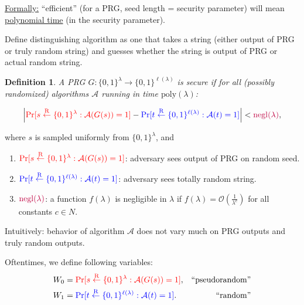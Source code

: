 \documentclass{article}
\newtheorem{definition}{Definition}
\begin{document}
\underline{Formally:} ``efficient'' (for a PRG, seed length = security parameter) will mean \underline{polynomial time} (in the security parameter).

Define distinguishing algorithm as one that takes a string (either output of PRG or truly random string) and guesses whether the string is output of PRG or actual random string.

\begin{definition}
A PRG $G:\{0,1\}^{\lambda} \rightarrow \{0,1\}^{\ell(\lambda)}$ is secure if for all (possibly randomized) algorithms $\mathcal{A}$ running in time $\mathrm{poly}(\lambda)$: 
\end{definition}
                                          
\begin{eqnarray*}
    \left | {\color{red} \mathrm{Pr}[s \overset{\rm R}{\leftarrow} \{0,1\}^{\lambda} : \mathcal{A}(G(s))=1]} - {\color{blue} \mathrm{Pr}[t \overset{\mathrm{R}}{\leftarrow} \{0,1\}^{\ell(\lambda)} : \mathcal{A}(t)=1]} \right |< {\color{purple} \mathrm{negl}(\lambda)},
\end{eqnarray*}

where $s$ is sampled uniformly from $\{0,1\}^{\lambda}$, and
\begin{enumerate}
\item ${\color{red} \mathrm{Pr}[s \overset{\rm R}{\leftarrow} \{0,1\}^{\lambda} : \mathcal{A}(G(s))=1]}$: adversary sees output of PRG on random seed. 

\item ${\color{blue} \mathrm{Pr}[t \overset{\rm R}{\leftarrow} \{0,1\}^{\ell(\lambda)} : \mathcal{A}(t)=1]}$: adversary sees totally random string.

\item ${\color{purple} \mathrm{negl}(\lambda)}$: a function $f(\lambda)$ is negligible in $\lambda$ if $f(\lambda) = \mathcal{O}(\frac{1}{\lambda^c})$ for all constants $c \in N$.
\end{enumerate}

Intuitively: behavior of algorithm $\mathcal{A}$ does not vary much on PRG outputs and truly random outputs.

Oftentimes, we define following variables:
\begin{eqnarray}
    & W_0 = {\color{red}\mathrm{Pr}[s \overset{\mathrm{R}}{\leftarrow} \{ 0,1 \}^{\lambda}: \mathcal{A}(G(s))=1]}, & \text{``pseudorandom''} \nonumber\\
    & W_1 = {\color{blue}\mathrm{Pr}[t \overset{\mathrm{R}}{\leftarrow} \{ 0,1 \}^{\ell(\lambda)}: \mathcal{A}(t)=1]}. & \text{``random''} \nonumber
\end{eqnarray}
\end{document}
